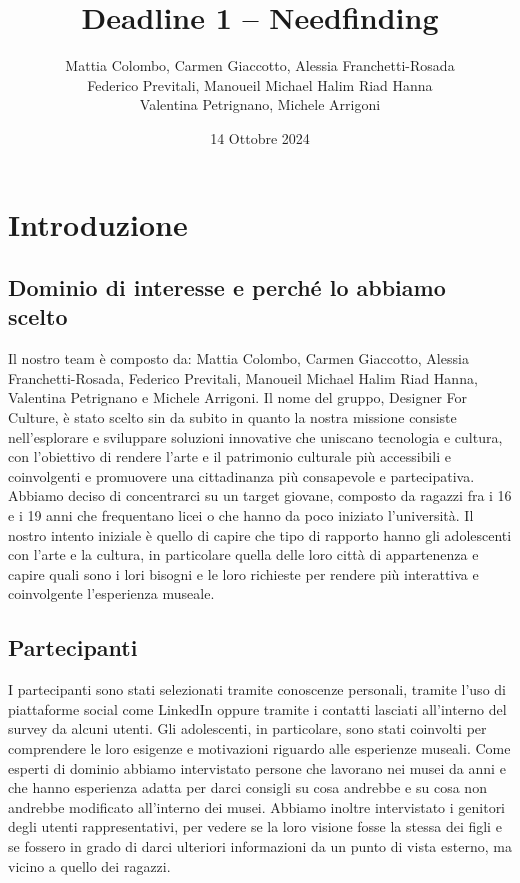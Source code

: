 \documentclass{article}
\title{Deadline 1 – Needfinding}
\author{Mattia Colombo, Carmen Giaccotto, Alessia Franchetti-Rosada \\Federico Previtali, Manoueil Michael Halim Riad Hanna \\ Valentina Petrignano, Michele Arrigoni}
\date{14 Ottobre 2024}
\begin{document}
\maketitle

\section{Introduzione}

\subsection{Dominio di interesse e perché lo abbiamo scelto}

Il nostro team è composto da: Mattia Colombo, Carmen Giaccotto, Alessia Franchetti-Rosada, Federico Previtali, Manoueil Michael Halim Riad Hanna, Valentina Petrignano e Michele Arrigoni.
Il nome del gruppo, Designer For Culture, è stato scelto sin da subito in quanto la nostra missione consiste nell’esplorare e sviluppare soluzioni innovative che uniscano tecnologia e cultura, con l’obiettivo di rendere l’arte e il patrimonio culturale più accessibili e coinvolgenti e promuovere una cittadinanza più consapevole e partecipativa. Abbiamo deciso di concentrarci su un target giovane, composto da ragazzi fra i 16 e i 19 anni che frequentano licei o che hanno da poco iniziato l’università. Il nostro intento iniziale è quello di capire che tipo di rapporto hanno gli adolescenti con l’arte e la cultura, in particolare quella delle loro città di appartenenza e capire quali sono i lori bisogni e le loro richieste per rendere più interattiva e coinvolgente l’esperienza museale.

\subsection{Partecipanti}

I partecipanti sono stati selezionati tramite conoscenze personali, tramite l’uso di piattaforme social come LinkedIn oppure tramite i contatti lasciati all’interno del survey da alcuni utenti.
Gli adolescenti, in particolare, sono stati coinvolti per comprendere le loro esigenze e motivazioni riguardo alle esperienze museali.
Come esperti di dominio abbiamo intervistato persone che lavorano nei musei da anni e che hanno esperienza adatta per darci consigli su cosa andrebbe e su cosa non andrebbe modificato all’interno dei musei. Abbiamo inoltre intervistato i genitori degli utenti rappresentativi, per vedere se la loro visione fosse la stessa dei figli e se fossero in grado di darci ulteriori informazioni da un punto di vista esterno, ma vicino a quello dei ragazzi.\\
\end{document}
